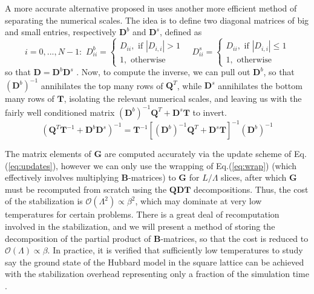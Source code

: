 A more accurate alternative proposed in \cite{bai_stable_2011} uses another more efficient method of separating the numerical scales.
The idea is to define two diagonal matrices of big and small entries, respectively $\bm D^b$ and $\bm D^s$, defined as
\begin{equation}
i = 0,..., N-1 :\,\,
D_{i i}^b =
\begin{cases}
D_{i i} , \,\, \text{if} \,\, | D_{i, i} | > 1 \\
1 , \,\, \text{otherwise}
\end{cases}
\quad
D_{i i}^s =
\begin{cases}
D_{i i} , \,\, \text{if} \,\, | D_{i, i} | \le 1 \\
1 , \,\, \text{otherwise}
\end{cases}
\end{equation}
so that $\bm D = \bm D^b \bm D^s$ .
Now, to compute the inverse, we can pull out $\bm D^b$, so that $(\bm D^b)^{-1}$ annihilates the top many rows of $\bm Q^T$, while $\bm D^s$ annihilates the bottom many rows of $\bm T$, isolating the relevant numerical scales, and leaving us with the fairly well conditioned matrix $(\bm D^b)^{-1} \bm Q^T + \bm D^s \bm T$ to invert.
\begin{equation}
( \bm Q^T \bm T^{-1} + \bm D^b \bm D^s )^{-1} = \bm T^{-1} [ (\bm D^b)^{-1} \bm Q^T + \bm D^s \bm T ]^{-1} (\bm D^b)^{-1}
\end{equation}

The matrix elements of $\bm G$ are computed accurately via the update scheme of Eq.(\ref{eq:updates}), however we can only use the wrapping of Eq.(\ref{eq:wrap}) (which effectively involves multiplying $\bm B$-matrices) to   $\bm G$ for $L / \Lambda$ slices, after which $\bm G$ must be recomputed from scratch using the $\bm Q \bm D \bm T$ decompositions.
Thus, the cost of the stabilization is $\mathcal{O} ( \Lambda^2 ) \propto 
\beta^2$, which may dominate at very low temperatures for certain problems.
There is a great deal of recomputation involved in the stabilization, and we will present a method of storing the decomposition of the partial product of $\bm B$-matrices, so that the cost is reduced to $\mathcal{O}(\Lambda) \propto \beta$.
In practice, it is verified that sufficiently low temperatures to study say the ground state of the Hubbard model in the square lattice can be achieved with the stabilization overhead representing only a fraction of the simulation time \cite{hanke_electronic_nodate,white_numerical_1989}.

